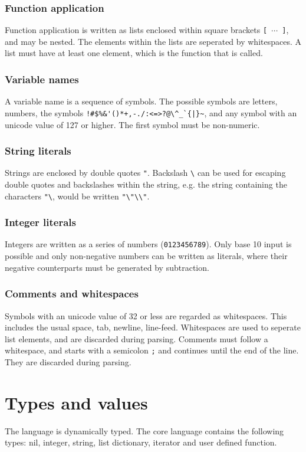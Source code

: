 \subsubsection{Function application}
Function application is written as lists enclosed within square brackets \verb|[ |$\cdots$\verb| ]|, and may be nested. The elements within the lists are seperated by whitespaces. A list must have at least one element, which is the function that is called.

\subsubsection{Variable names}
A variable name is a sequence of symbols. The possible symbols are letters, numbers, the symbols \verb]!#$%&'()*+,-./:<=>?@\^_`{|}~], and any symbol with an unicode value of 127 or higher. The first symbol must be non-numeric.

\subsubsection{String literals}
Strings are enclosed by double quotes \verb|"|. Backslash \verb|\| can be used for escaping double quotes and backslashes within the string, e.g. the string containing the characters \verb|"\|, would be written \verb|"\"\\"|.

\subsubsection{Integer literals}
Integers are written as a series of numbers (\verb|0123456789|). Only base 10 input is possible and only non-negative numbers can be written as literals, where their negative counterparts must be generated by subtraction.

\subsubsection{Comments and whitespaces}
Symbols with an unicode value of 32 or less are regarded as whitespaces. This includes the usual space, tab, newline, line-feed. Whitespaces are used to seperate list elements, and are discarded during parsing.
Comments must follow a whitespace, and starts with a semicolon \verb|;| and continues until the end of the line. They are discarded during parsing. 


\section{Types and values}
The language is dynamically typed.
The core language contains the following types: nil, integer, string, list dictionary, iterator and user defined function.

